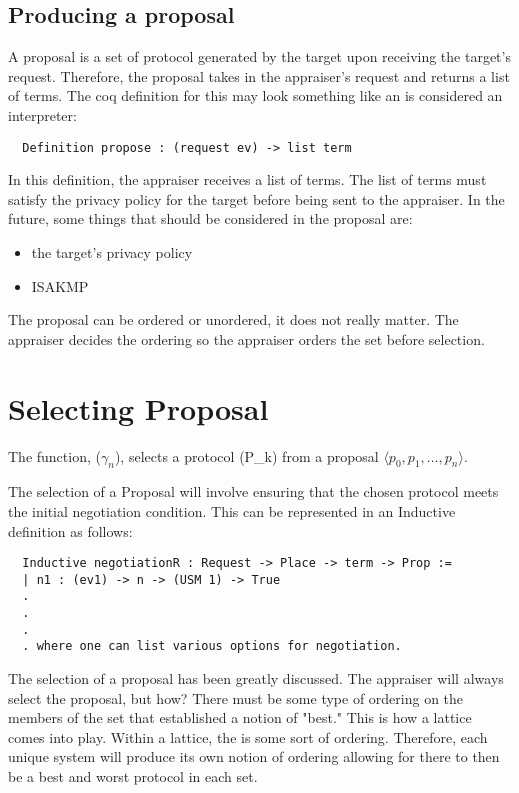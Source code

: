 \documentclass[10pt]{report}
\newcommand{\squash}{\itemsep=0pt\parskip=0pt}
\begin{document}
\subsection {Producing a proposal}

  A proposal is a set of protocol generated by the target upon receiving the target's request. Therefore, the proposal takes in the appraiser's request and returns a list of terms. The coq definition for this may look something like an is considered an interpreter: 
  
  \begin{verbatim}
  Definition propose : (request ev) -> list term
  \end{verbatim}  
  
  In this definition, the appraiser receives a list of terms. The list of terms must satisfy the privacy policy for the target before being sent to the appraiser. In the future, some things that should be considered in the proposal are:
  
  \begin{itemize}
   \squash
   \item the target's privacy policy
   \item ISAKMP
  \end{itemize}
  
	The proposal can be ordered or unordered, it does not really matter. The appraiser decides the ordering so the appraiser orders the set before selection.  

\section {Selecting Proposal}

  The function, ($\gamma_{n}$), selects a protocol (P_{k}) 
  from a proposal $\langle p_0,p_1,\ldots,p_n\rangle$.  

  The selection of a Proposal will involve ensuring that the chosen protocol meets the initial negotiation condition. This can be represented in an Inductive definition as follows:
  
  \begin{verbatim}
  Inductive negotiationR : Request -> Place -> term -> Prop :=
  | n1 : (ev1) -> n -> (USM 1) -> True
  .
  .
  .
  . where one can list various options for negotiation. 
  \end{verbatim} 
  
  	The selection of a proposal has been greatly discussed. The appraiser will always select the proposal, but how? There must be some type of ordering on the members of the set that established a notion of "best." This is how a lattice comes into play. Within a lattice, the is some sort of ordering. Therefore, each unique system will produce its own notion of ordering allowing for there to then be a best and worst protocol in each set. 
	
\end{document}
